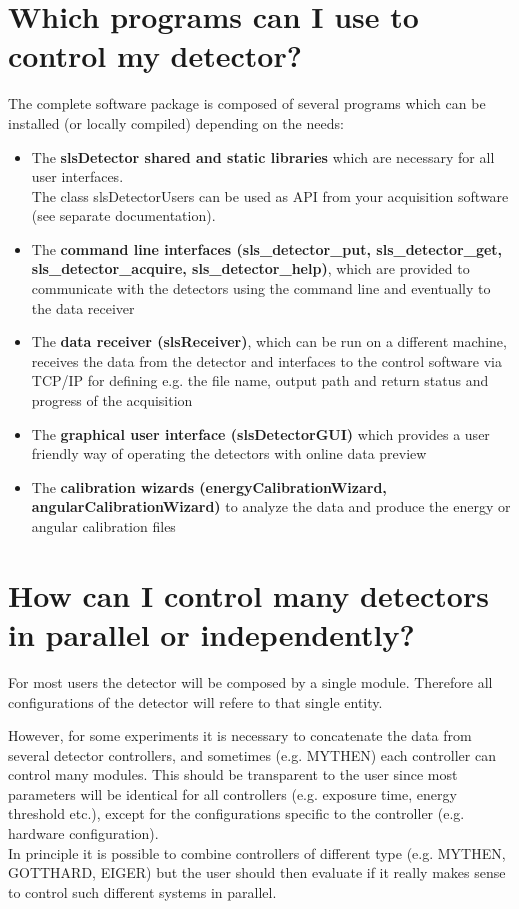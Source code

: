 

\section{Which programs can I use to control my detector?}

The complete software package is composed of several programs which can be installed (or locally compiled) depending on the needs:

\begin{itemize}
\item The \textbf{slsDetector shared and static libraries} which are necessary for all user interfaces. \\
  The class slsDetectorUsers can be used as API from your acquisition software (see separate documentation).
\item The \textbf{command line interfaces (sls\_detector\_put, sls\_detector\_get, sls\_detector\_acquire, sls\_detector\_help)}, which are provided to communicate with the detectors using the command line and eventually to the data receiver
\item The \textbf{data receiver (slsReceiver)}, which can be run on a different machine, receives the data from the detector and interfaces to the control software via TCP/IP for defining e.g. the file name, output path and return status and progress of the acquisition
\item The  \textbf{graphical user interface (slsDetectorGUI)} which provides a user friendly way of operating the detectors with online data preview
\item The  \textbf{calibration wizards (energyCalibrationWizard, angularCalibrationWizard)} to analyze the data and produce the energy or angular calibration files
\end{itemize}

\section{How can I control many detectors in parallel or independently?}

For most users the detector will be composed by a single module. Therefore all configurations of the detector will refere to that single entity.

However, for some experiments it is necessary to concatenate the data from several detector controllers, and sometimes (e.g. MYTHEN) each controller can control many modules. This should be transparent to the user since most parameters will be identical for all controllers (e.g. exposure time, energy threshold etc.), except for the configurations specific to the controller (e.g. hardware configuration).\\
In principle it is possible to combine controllers of different type (e.g. MYTHEN, GOTTHARD, EIGER) but the user should then evaluate if it really makes sense to control such different systems in parallel.

